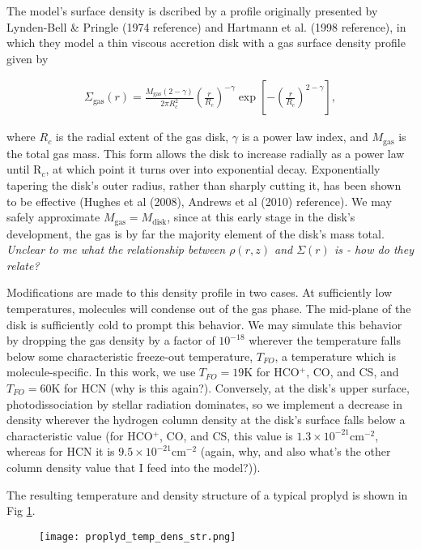 The model's surface density is dscribed by a profile originally presented by Lynden-Bell & Pringle (1974 reference) and Hartmann et al. (1998 reference), in which they model a thin viscous accretion disk with a gas surface density profile given by

\begin{align}
  \Sigma_{\text{gas}}(r) = \frac{M_{\text{gas}} (2 - \gamma)}{2 \pi R_c^2} \left(\frac{r}{R_c} \right)^{-\gamma} \exp \left[-\left(\frac{r}{R_c} \right)^{2-\gamma} \right],
\end{align}

where $R_c$ is the radial extent of the gas disk, $\gamma$ is a power law index, and $M_\text{gas}$ is the total gas mass. This form allows the disk to increase radially as a power law until R$_c$, at which point it turns over into exponential decay. Exponentially tapering the disk's outer radius, rather than sharply cutting it, has been shown to be effective (Hughes et al (2008), Andrews et al (2010) reference). We may safely approximate $M_\text{gas} = M_\text{disk}$, since at this early stage in the disk's development, the gas is by far the majority element of the disk's mass total. \textit{Unclear to me what the relationship between $\rho(r, z)$ and $\Sigma(r)$ is - how do they relate?}

Modifications are made to this density profile in two cases. At sufficiently low temperatures, molecules will condense out of the gas phase. The mid-plane of the disk is sufficiently cold to prompt this behavior. We may simulate this behavior by dropping the gas density by a factor of $10^{-18}$ wherever the temperature falls below some characteristic freeze-out temperature, $T_{FO}$, a temperature which is molecule-specific. In this work, we use $T_{FO} = 19$K for HCO$^+$, CO, and CS, and $T_{FO} = 60$K for HCN (why is this again?). Conversely, at the disk's upper surface, photodissociation by stellar radiation dominates, so we implement a decrease in density wherever the hydrogen column density at the disk's surface falls below a characteristic value (for HCO$^+$, CO, and CS, this value is $1.3 \times 10^{-21} \text{cm}^{-2}$, whereas for HCN it is $9.5 \times 10^{-21} \text{cm}^{-2}$ (again, why, and also what's the other column density value that I feed into the model?)).



The resulting temperature and density structure of a typical proplyd is shown in Fig \ref{fig:temp_dens_str}.

\begin{figure}[htp]
\centering
  \texttt{[image: proplyd\_temp\_dens\_str.png]}
  \label{fig:temp_dens_str}
\end{figure}






